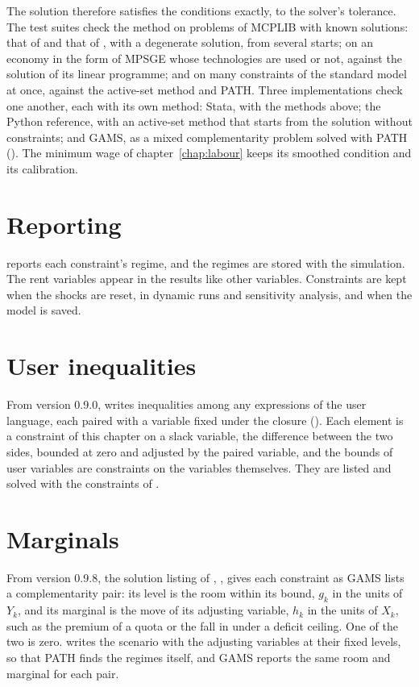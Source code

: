 The solution therefore satisfies the conditions exactly, to the solver's
tolerance. The test suites check the method on problems of MCPLIB
\citep{dirkse1995} with known solutions: that of \citet{josephy1979} and that
of \citet{kojima1986}, with a degenerate solution, from several starts; on
an economy in the form of MPSGE whose technologies are used or not, against
the solution of its linear programme; and on many constraints of the
standard model at once, against the active-set method and PATH. Three
implementations check one another, each with its own method: Stata, with the
methods above; the Python reference, with an active-set
method that starts from the solution without constraints; and GAMS, as a mixed
complementarity problem solved with PATH (). The
minimum wage of chapter~\ref{chap:labour} keeps its smoothed condition and its
calibration.

\section{Reporting}

 reports each constraint's regime, and the regimes are stored
with the simulation. The rent variables appear in the results like other
variables. Constraints are kept when the shocks are reset, in dynamic runs and
sensitivity analysis, and when the model is saved.

\section{User inequalities}

From version 0.9.0,  writes inequalities among any
expressions of the user language, each paired with a variable fixed under the
closure (). Each element is a constraint of this chapter
on a slack variable, the difference between the two sides, bounded at zero
and adjusted by the paired variable, and the bounds of user variables are
constraints on the variables themselves. They are listed and solved with the
constraints of .

\section{Marginals}\label{sec:cons-marginals}

From version 0.9.8, the solution listing of ,
, gives each constraint as GAMS lists a complementarity pair:
its level is the room within its bound, $g_k$ in the units of $Y_k$, and its
marginal is the move of its adjusting variable, $h_k$ in the units of $X_k$,
such as the premium of a quota or the fall in  under a deficit
ceiling. One of the two is zero.  writes the scenario with the
adjusting variables at their fixed levels, so that PATH finds the regimes
itself, and GAMS reports the same room and marginal for each pair.

